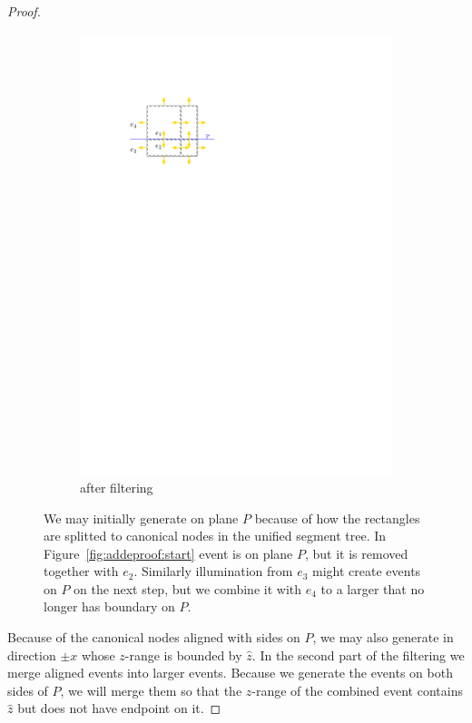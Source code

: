\documentclass[english,gradu]{tktltiki2018}
\begin{document}
\begin{proof}
\begin{figure}
\begin{subfigure}[t]{0.3\textwidth}
		\includegraphics[width=\textwidth,page=2]{fig/addeproof}
		\caption{\addEs after filtering}\label{fig:addeproof:end}
	\end{subfigure}
	\caption{We may initially generate \addEs on plane $P$ because of how the rectangles are splitted to canonical nodes in the unified segment tree.
	In Figure~\ref{fig:addeproof:start} event is on plane $P$, but it is removed together with $e_2$.
	Similarly illumination from $e_3$ might create events on $P$ on the next step, but we combine it with $e_4$ to a larger \addE that no longer has boundary on $P$.
	}\label{fig:addeproof}
\end{figure}

Because of the canonical nodes aligned with sides on $P$, we may also generate \addEs in direction $\pm x$ whose $z$-range is bounded by $\hat{z}$.
In the second part of the filtering we merge aligned events into larger events.
Because we generate the events on both sides of $P$, we will merge them so that the $z$-range of the combined event contains $\hat{z}$ but does not have endpoint on it.


\end{proof}
\end{document}
